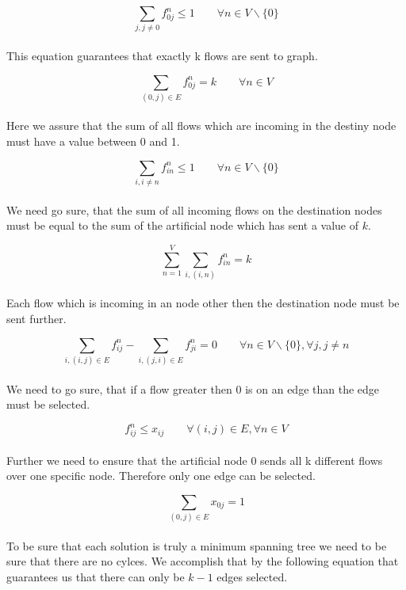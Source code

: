 \begin{equation}
  \sum_{j, j \neq 0}  f_{0j}^n \leq 1 \qquad \forall n \in V \backslash \{0\}
\end{equation}
\\
This equation guarantees that exactly k flows are sent to graph.

\begin{equation}
  \sum_{(0,j) \in E}  f_{0j}^n = k \qquad \forall n \in V
\end{equation}
\\
Here we assure that the sum of all flows which are incoming in the destiny node must have a value between 0 and 1.

\begin{equation}
  \sum_{i, i \neq n}  f_{in}^n \leq 1 \qquad \forall n \in V \backslash \{0\}
\end{equation}
\\
We need go sure, that the sum of all incoming flows on the destination nodes must be equal to the sum of the artificial node which has sent a value of $k$.

\begin{equation}
  \sum_{n=1}^V \sum_{i, (i,n)}  f_{in}^n= k
\end{equation}
\\
Each flow which is incoming in an node other then the destination node must be sent further.

\begin{equation}
  \sum_{i, (i,j) \in E}  f_{ij}^n -  \sum_{i, (j,i) \in E}  f_{ji}^n = 0 \qquad \forall n \in V \backslash \{0\}, \forall j, j \neq n
\end{equation}
\\
We need to go sure, that if a flow greater then 0 is on an edge than the edge must be selected.

\begin{equation}
  f_{ij}^n \leq x_{ij} \qquad \forall (i,j) \in E, \forall n \in V
\end{equation}
\\
Further we need to ensure that the artificial node $0$ sends all k different flows over one specific node. Therefore only one edge can be selected.

\begin{equation}
  \sum_{(0, j) \in E}  x_{0j} = 1
\end{equation}
\\
To be sure that each solution is truly a minimum spanning tree we need to be sure that there are no cylces. We accomplish that by the following equation that guarantees us that there can only be $k-1$ edges selected.

